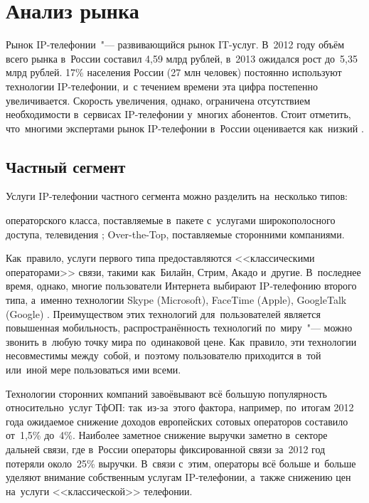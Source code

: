 \chapter{Анализ рынка}

Рынок IP-телефонии~"--- развивающийся рынок IT-услуг.
В~2012 году объём всего рынка в~России составил 4,59 млрд рублей, в~2013 ожидался рост до~5,35 млрд рублей.
17\% населения России (27 млн человек) постоянно используют технологии IP-телефонии, и~с течением времени эта цифра постепенно увеличивается.
Скорость увеличения, однако, ограничена отсутствием необходимости в~сервисах IP-телефонии у~многих абонентов.
Стоит отметить, что~многими экспертами рынок IP-телефонии в~России оценивается как~низкий .

\section{Частный сегмент}

Услуги IP-телефонии частного сегмента можно разделить на~несколько типов:
\begin{itemize}
     операторского класса, поставляемые в~пакете с~услугами широкополосного доступа, телевидения \etc;
		 Over-the-Top, поставляемые сторонними компаниями.
\end{itemize}

Как~правило, услуги первого типа предоставляются <<классическими операторами>> связи, такими как~Билайн, Стрим, Акадо и~другие.
В~последнее время, однако, многие пользователи Интернета выбирают IP-телефонию второго типа, а~именно технологии Skype (Microsoft), FaceTime (Apple), GoogleTalk (Google) \etc.
Преимуществом этих технологий для~пользователей является повышенная мобильность, распространённость технологий по~миру~"--- можно звонить в~любую точку мира по~одинаковой цене.
Как~правило, эти технологии несовместимы между~собой, и~поэтому пользователю приходится в~той или~иной мере пользоваться ими всеми.

Технологии сторонних компаний завоёвывают всё большую популярность относительно~услуг ТфОП: так~из-за~этого фактора, например, по~итогам 2012 года ожидаемое снижение доходов европейских сотовых операторов составило от~1,5\% до~4\%.
Наиболее заметное снижение выручки заметно в~секторе дальней связи, где в~России операторы фиксированной связи за~2012 год потеряли около~25\% выручки.
В~связи с~этим, операторы всё больше и~больше уделяют внимание собственным услугам IP-телефонии, а~также снижению цен на~услуги <<классической>> телефонии.

